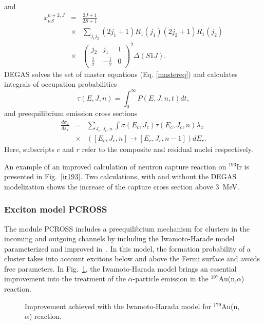 \documentclass[twocolumn,amsmath,amssymb,10pt,groupedaddress,a4paper]{revtex4}
\begin{document}
and
\begin{eqnarray}
x_{nS}^{n+2,J}&=&\frac{2J+1}{2S+1}\nonumber\\
&\times&\sum_{j_{1}j_{2}}(2j_{1}+1)R_{1}(j_{1})(2j_{2}+1)R_{1}(j_{2})\nonumber\\
&\times&\left(\begin{array}{ccc}
j_{2} & j_{1} & 1\\
\frac{1}{2} & -\frac{1}{2} & 0\end{array}\right)^{2}\Delta(S1J).
\end{eqnarray}
DEGAS solves the set of master equations (Eq. \ref{mastereq})
and calculates integrals of occupation probabilities
\begin{equation}
\tau(E,J,n)=\int_{0}^{\infty}P(E,J,n,t)dt,
\end{equation}
and preequilibrium emission cross sections
\begin{eqnarray}
\frac{d\sigma_{x}}{d\varepsilon_{x}}&=&\sum_{J_{c},J_{r},n}\int\sigma(E_{c},J_{c})\tau(E_{c},J_{c},n)\lambda_{x}\nonumber\\
&\times&\left(\left[E_{c},J_{c},n\right]\rightarrow\left[E_{r},J_{r},n-1\right]\right)dE_{r}.
\end{eqnarray}
Here, subscripts $c$ and $r$ refer to the composite and residual
nuclei respectively.

An example of an improved calculation of neutron capture reaction on $^{193}$Ir is presented
in Fig.~\ref{ir193}. Two calculations, with and without the DEGAS modelization shows the increase
of the capture cross section above 3~MeV.



\subsubsection{Exciton model PCROSS\label{PCROSS}}
The module PCROSS includes a preequilibrium mechanism for clusters in the incoming and outgoing
channels by including the Iwamoto-Harade model~\cite{Iwamoto} parameterized and improved
in~\cite{Sato,Zhang1,Zhang2}. In this model, the formation probability of a cluster takes into
account excitons below and above the Fermi surface and avoids free parameters. In Fig.~\ref{goldna},
the Iwamoto-Harada model brings an essential improvement into the treatment of the $\alpha$-particle
 emission in the $^{197}$Au(n,$\alpha$) reaction.
\begin{figure}[htbp]
\caption{Improvement achieved with the Iwamoto-Harada model for $^{179}$Au(n,$\alpha$) reaction.}
\label{goldna}
\end{figure}
\end{document}
